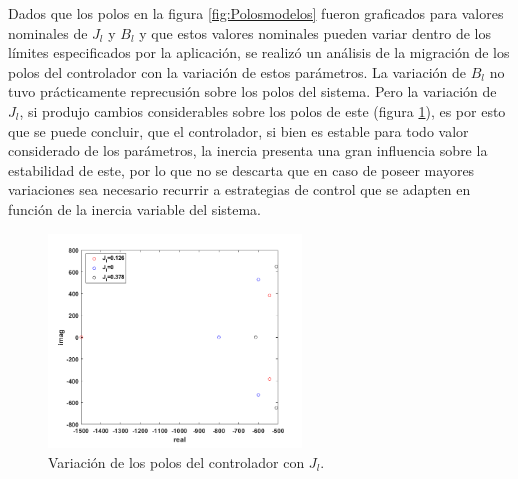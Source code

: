 \documentclass[10pt]{article}
\begin{document}
	Dados que los polos en la figura \ref{fig:Polosmodelos} fueron graficados para valores nominales de $J_{l}$ y $B_{l}$ y que estos valores nominales pueden variar dentro de los límites especificados por la aplicación, se realizó un análisis de la migración de los polos del controlador con la variación de estos parámetros. La variación de $B_{l}$ no tuvo prácticamente reprecusión sobre los polos del sistema. Pero la variación de $J_{l}$, si produjo cambios considerables sobre los polos de este (figura \ref{fig:PoloJeq}), es por esto que se puede concluir, que el controlador, si bien es estable para todo valor considerado de los parámetros, la inercia presenta una gran influencia sobre la estabilidad de este, por lo que no se descarta que en caso de poseer mayores variaciones sea necesario recurrir a estrategias de control que se adapten en función de la inercia variable del sistema.
	\begin{figure}[h!]
	\centering
	\includegraphics[width=0.6\textwidth]{PoloJeq.png}
	\caption{\label{fig:PoloJeq}Variación de los polos del controlador con $J_{l}$.}
	\end{figure}
	
\newpage
\end{document}
